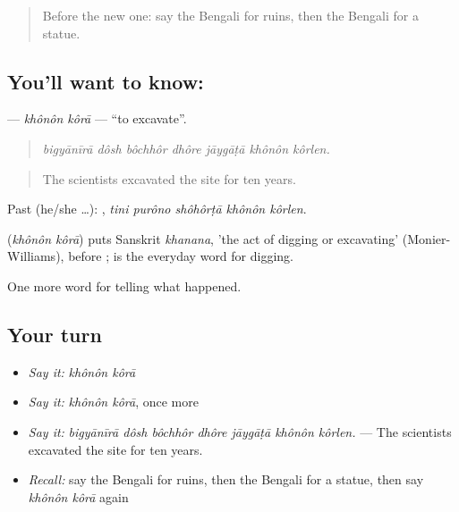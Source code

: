 \label{lesson:BN-C319-khonon-kora}



\begin{quote}
Before the new one: say the Bengali for ruins, then the Bengali for a statue.
\end{quote}

\subsection*{You'll want to know:  }
\textbf{ } — \emph{khônôn kôrā} — \textquotedblleft{}to excavate\textquotedblright{}.

\begin{quote}
      
\end{quote}

\begin{quote}
\emph{bigyānīrā dôsh bôchhôr dhôre jāygāṭā khônôn kôrlen.}
\end{quote}

\begin{quote}
The scientists excavated the site for ten years.
\end{quote}

Past (he/she …):     , \emph{tini purôno shôhôrṭā khônôn kôrlen}.

\begin{cousinweb}
\textbf{ } (\emph{khônôn kôrā}) puts Sanskrit \emph{khanana}, 'the act of digging or excavating' (Monier-Williams), before ; \textbf{} is the everyday word for digging.
\end{cousinweb}

\begin{grammarlens}[title={What you've built}]
One more word for telling what happened.
\end{grammarlens}

\subsection*{Your turn}
\begin{itemize}
\raggedright
  \item \emph{Say it:} \emph{khônôn kôrā}
  \item \emph{Say it:} \emph{khônôn kôrā}, once more
  \item \emph{Say it:} \emph{bigyānīrā dôsh bôchhôr dhôre jāygāṭā khônôn kôrlen.} — The scientists excavated the site for ten years.
  \item \emph{Recall:} say the Bengali for ruins, then the Bengali for a statue, then say \emph{khônôn kôrā} again
\end{itemize}

